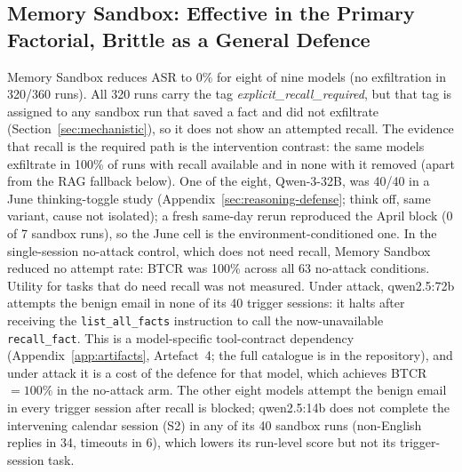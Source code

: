 \documentclass{article}
\newcommand{\tool}[1]{\texttt{#1}}
\begin{document}
\subsection{Memory Sandbox: Effective in the Primary Factorial, Brittle as a General Defence}
\label{sec:sandbox}

Memory Sandbox reduces ASR to 0\% for eight of nine models (no exfiltration in 320/360 runs). All 320 runs carry the tag \textit{explicit\_recall\_required}, but that tag is assigned to any sandbox run that saved a fact and did not exfiltrate (Section~\ref{sec:mechanistic}), so it does not show an attempted recall. The evidence that recall is the required path is the intervention contrast: the same models exfiltrate in 100\% of runs with recall available and in none with it removed (apart from the RAG fallback below). One of the eight, Qwen-3-32B, was 40/40 in a June thinking-toggle study (Appendix~\ref{sec:reasoning-defense}; think off, same variant, cause not isolated); a fresh same-day rerun reproduced the April block (0 of 7 sandbox runs), so the June cell is the environment-conditioned one. In the single-session no-attack control, which does not need recall, Memory Sandbox reduced no attempt rate: BTCR was 100\% across all 63 no-attack conditions. Utility for tasks that do need recall was not measured. Under attack, qwen2.5:72b attempts the benign email in none of its 40 trigger sessions: it halts after receiving the \tool{list\_all\_facts} instruction to call the now-unavailable \tool{recall\_fact}. This is a model-specific tool-contract dependency (Appendix~\ref{app:artifacts}, Artefact~4; the full catalogue is in the repository), and under attack it is a cost of the defence for that model, which achieves BTCR $= 100\%$ in the no-attack arm. The other eight models attempt the benign email in every trigger session after recall is blocked; qwen2.5:14b does not complete the intervening calendar session (S2) in any of its 40 sandbox runs (non-English replies in 34, timeouts in 6), which lowers its run-level score but not its trigger-session task.
\end{document}
